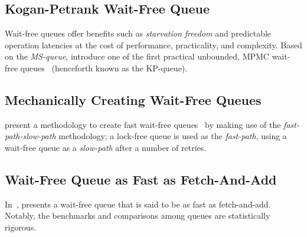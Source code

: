


\subsection{Kogan-Petrank Wait-Free Queue}
Wait-free queues offer benefits such as \emph{starvation freedom} and predictable
operation latencies at the cost of performance, practicality, and complexity.
Based on the \emph{MS-queue}, \citeauthor{kogan2011wait} introduce one of the first practical unbounded, MPMC
wait-free queues~\citep{kogan2011wait} (henceforth known as the KP-queue).

\subsection{Mechanically Creating Wait-Free Queues}
\citeauthor{kogan2012methodology} present a methodology to create fast wait-free
queues~\citep{kogan2012methodology} by making use of the
\emph{fast-path-slow-path} methodology; a lock-free queue is used as the
\emph{fast-path}, using a wait-free queue as a \emph{slow-path} after a number
of retries.

\subsection{Wait-Free Queue as Fast as Fetch-And-Add}
In~\citep{yang2016wait}, \citeauthor{yang2016wait} presents a wait-free queue
that is said to be as fast as fetch-and-add. Notably, the benchmarks and
comparisons among queues are statistically rigorous.